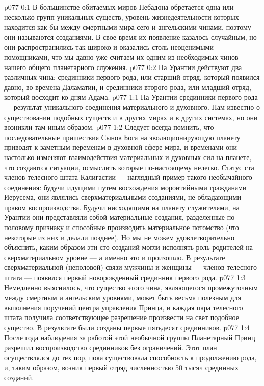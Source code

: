 \author{Архангел}
\vs p077 0:1 В большинстве обитаемых миров Небадона обретается одна или несколько групп уникальных существ, уровень жизнедеятельности которых находится как бы между смертными мира сего и ангельскими чинами, поэтому они называются  созданиями. В свое время их появление казалось случайным, но они распространились так широко и оказались столь неоценимыми помощниками, что мы давно уже считаем их одним из необходимых чинов нашего общего планетарного служения.
\vs p077 0:2 На Урантии действуют два различных чина: срединники первого рода, или старший отряд, который появился давно, во времена Даламатии, и срединники второго рода, или младший отряд, который восходит ко дням Адама.
\vs p077 1:1 На Урантии срединники первого рода --- результат уникального соединения материального и духовного. Нам известно о существовании подобных существ и в других мирах и в других системах, но они возникли там иным образом.
\vs p077 1:2 Следует всегда помнить, что последовательные пришествия Сынов Бога на эволюционирующую планету приводят к заметным переменам в духовной сфере мира, и временами они настолько изменяют взаимодействия материальных и духовных сил на планете, что создаются ситуации, осмыслить которые по\hyp{}настоящему нелегко. Статус ста членов телесного штата Калигастии --- наглядный пример такого необычайного соединения: будучи идущими путем восхождения моронтийными гражданами Иерусема, они являлись сверхматериальными созданиями, не обладающими правом воспроизводства. Будучи нисходящими на планету служителями, на Урантии они представляли собой материальные создания, разделенные по половому признаку и способные производить материальное потомство (что некоторые из них и делали позднее). Но мы не можем удовлетворительно объяснить, каким образом эти сто созданий могли исполнять роль родителей на сверхматериальном уровне --- а именно это и произошло. В результате сверхматериальной (неполовой) связи мужчины и женщины --- членов телесного штата --- появился первый новорожденный срединник первого рода.
\vs p077 1:3 Немедленно выяснилось, что существо этого чина, являющегося промежуточным между смертным и ангельским уровнями, может быть весьма полезным для выполнения поручений центра управления Принца, и каждая пара телесного штата получила соответствующее разрешение произвести на свет подобное существо. В результате были созданы первые пятьдесят срединников.
\vs p077 1:4 После года наблюдения за работой этой необычной группы Планетарный Принц разрешил воспроизводство срединников без ограничений. Этот план осуществлялся до тех пор, пока существовала способность к продолжению рода, и, таким образом, возник первый отряд численностью 50 тысяч срединных созданий.
